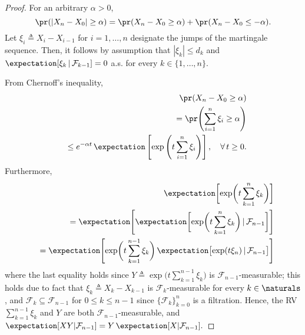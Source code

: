 \documentclass{article}
\theoremstyle{plain}
\begin{document}
\begin{proof}
For an arbitrary $\alpha > 0$,
\begin{equation}
\pr(|X_n - X_0| \geq \alpha) = \pr(X_n - X_0 \geq \alpha) + \pr(X_n - X_0 \leq -\alpha).
\label{eq: union of disjoint events}
\end{equation}
Let $\xi_i \triangleq X_i - X_{i-1}$ for $i=1, \ldots, n$ designate
the jumps of the martingale sequence. Then, it follows by assumption that
$|\xi_k| \leq d_k$ and $\expectation[\xi_k \, | \, \mathcal{F}_{k-1}] = 0$
a.s. for every $k \in \{1, \ldots, n\}$.

From Chernoff's inequality,
\begin{eqnarray}
&& \pr(X_n - X_0 \geq \alpha) \nonumber \\
&& = \pr \Biggl(\sum_{i=1}^n \xi_i \geq \alpha \Biggr) \nonumber \\
&& \leq e^{-\alpha t} \, \expectation\left[\exp \left(t \sum_{i=1}^n \xi_i \right) \right],
\quad \forall \, t \geq 0.
\label{eq: Chernoff's inequality}
\end{eqnarray}
Furthermore,
\begin{eqnarray}
&& \expectation \biggl[ \exp \biggl(t \sum_{k=1}^n \xi_k \biggr)
\biggr] \nonumber \\
&& = \expectation \Biggl[ \expectation \biggl[ \exp \biggl(t
\sum_{k=1}^n \xi_k \biggr) \, | \, \mathcal{F}_{n-1} \biggr] \Biggr]
\nonumber \\
&& = \expectation \Biggl[ \exp \biggl(t \sum_{k=1}^{n-1} \xi_k
\biggr) \, \expectation \bigl[ \exp(t \xi_n) \, | \,
\mathcal{F}_{n-1} \bigr] \Biggr]
\label{eq: smoothing theorem}
\end{eqnarray}
where the last equality holds since $Y \triangleq \exp \bigl(t
\sum_{k=1}^{n-1} \xi_k \bigr)$ is $\mathcal{F}_{n-1}$-measurable;
this holds due to fact that $\xi_k \triangleq X_k
- X_{k-1}$ is $\mathcal{F}_k$-measurable for every $k \in
\naturals$, and $\mathcal{F}_k \subseteq \mathcal{F}_{n-1}$ for $0
\leq k \leq n-1$ since $\{\mathcal{F}_k\}_{k=0}^{n}$ is a
filtration. Hence, the RV $\sum_{k=1}^{n-1} \xi_k$ and $Y$
are both $\mathcal{F}_{n-1}$-measurable, and
$\expectation[ XY | \mathcal{F}_{n-1}] =
Y \, \expectation[ X | \mathcal{F}_{n-1}].$


\end{proof}
\end{document}
